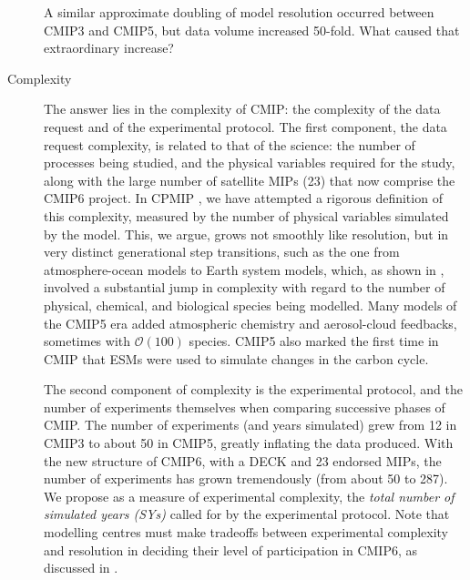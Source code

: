 \documentclass[gmd,manuscript]{copernicus}
\begin{document}
\begin{description}
  A similar approximate doubling of model resolution occurred between
  CMIP3 and CMIP5, but data volume increased 50-fold. What caused that
  extraordinary increase?
\item[Complexity] The answer lies in the complexity of CMIP: the
  complexity of the data request and of the experimental protocol. The
  first component, the data request complexity, is related to that of
  the science: the number of processes being studied, and the physical
  variables required for the study, along with the large number of
  satellite MIPs (23) that now comprise the CMIP6 project. In CPMIP
  \citep{ref:balajietal2017}, we have attempted a rigorous definition
  of this complexity, measured by the number of physical variables
  simulated by the model. This, we argue, grows not smoothly like
  resolution, but in very distinct generational step transitions, such
  as the one from atmosphere-ocean models to Earth system models,
  which, as shown in \cite{ref:balajietal2017}, involved a substantial
  jump in complexity with regard to the number of physical, chemical,
  and biological species being modelled. Many models of the CMIP5 era
  added atmospheric chemistry and aerosol-cloud feedbacks, sometimes
  with $\mathcal{O}(100)$ species. CMIP5 also marked the first time in
  CMIP that ESMs were used to simulate changes in the carbon cycle.

  The second component of complexity is the experimental protocol, and
  the number of experiments themselves when comparing successive
  phases of CMIP. The number of experiments (and years simulated) grew
  from 12 in CMIP3 to about 50 in CMIP5, greatly inflating the data
  produced. With the new structure of CMIP6, with a DECK and 23
  endorsed MIPs, the number of experiments has grown tremendously
  (from about 50 to 287). We propose as a measure of experimental
  complexity, the \emph{total number of simulated years (SYs)} called
  for by the experimental protocol. Note that modelling centres must
  make tradeoffs between experimental complexity and resolution in
  deciding their level of participation in CMIP6, as discussed in
  \cite{ref:balajietal2017}.
\end{description}
\end{document}
